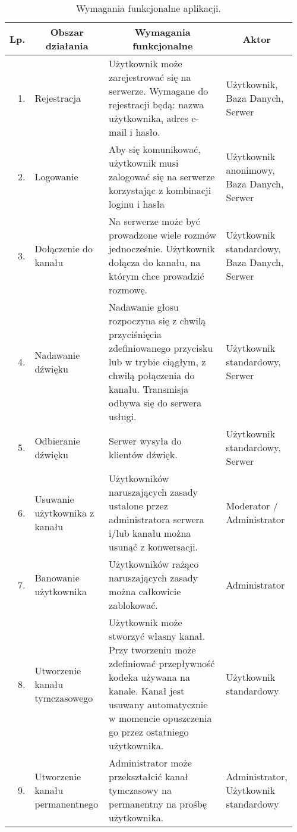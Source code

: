 \begin{table}[!hbp]
	\centering
	\caption{Wymagania funkcjonalne aplikacji.}
	\label{tab:wymfun}
	\begin{tabular}{|r|p{0.26\linewidth}|p{0.5\linewidth}|p{0.2\linewidth}|} \hline
		\multicolumn{1}{|c|}{\textbf{Lp.}} & \multicolumn{1}{|c|}{\textbf{Obszar działania}} & \multicolumn{1}{|c|}{\textbf{Wymagania funkcjonalne}} & \multicolumn{1}{|c|}{\textbf{Aktor}} \\ \hline
		1. & Rejestracja & Użytkownik może zarejestrować się na serwerze. Wymagane do rejestracji będą: nazwa użytkownika, adres e-mail i hasło. & Użytkownik, Baza Danych, Serwer \\ \hline
		2. & Logowanie & Aby się komunikować, użytkownik musi zalogować się na serwerze korzystając z kombinacji loginu i hasła & Użytkownik anonimowy, Baza Danych, Serwer\\ \hline
		3. & Dołączenie do kanału & Na serwerze może być prowadzone wiele rozmów jednocześnie. Użytkownik dołącza do kanału, na którym chce prowadzić rozmowę. & Użytkownik standardowy, Baza Danych, Serwer\\ \hline
		4. & Nadawanie dźwięku & Nadawanie głosu rozpoczyna się z chwilą przyciśnięcia zdefiniowanego przycisku lub w trybie ciągłym, z chwilą połączenia do kanału. Transmisja odbywa się do serwera usługi. & Użytkownik standardowy, Serwer\\ \hline
		5. & Odbieranie dźwięku & Serwer wysyła do klientów dźwięk. & Użytkownik standardowy, Serwer\\ \hline
		6. & Usuwanie użytkownika z kanału & Użytkowników naruszających zasady ustalone przez administratora serwera i/lub kanału można usunąć z konwersacji. & Moderator / Administrator\\ \hline
		7. & Banowanie użytkownika & Użytkowników rażąco naruszających zasady można całkowicie zablokować. & Administrator\\ \hline
		8. & Utworzenie kanału tymczasowego & Użytkownik może stworzyć własny kanał. Przy tworzeniu może zdefiniować przepływność kodeka używana na kanale. Kanał jest usuwany automatycznie w momencie opuszczenia go przez ostatniego użytkownika. & Użytkownik standardowy\\ \hline
		9. & Utworzenie kanału permanentnego & Administrator może przekształcić kanał tymczasowy na permanentny na prośbę użytkownika. & Administrator, Użytkownik standardowy \\ \hline
	\end{tabular}
\end{table}
